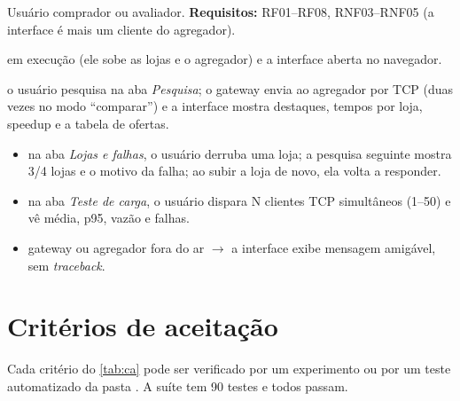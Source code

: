 \begin{description}[leftmargin=0pt, labelsep=0.4em, itemsep=0.15em]
  \item[Ator:] Usuário comprador ou avaliador. \textbf{Requisitos:} RF01--RF08, RNF03--RNF05 (a interface é mais um cliente do agregador).
  \item[Pré-condição:]  em execução (ele sobe as lojas e o agregador) e a interface aberta no navegador.
  \item[Fluxo principal:] o usuário pesquisa na aba \textit{Pesquisa}; o gateway envia  ao agregador por TCP (duas vezes no modo ``comparar'') e a interface mostra destaques, tempos por loja, speedup e a tabela de ofertas.
  \item[Fluxos alternativos:]\leavevmode
  \begin{itemize}
    \item[A1:] na aba \textit{Lojas e falhas}, o usuário derruba uma loja; a pesquisa seguinte mostra 3/4 lojas e o motivo da falha; ao subir a loja de novo, ela volta a responder.
    \item[A2:] na aba \textit{Teste de carga}, o usuário dispara N clientes TCP simultâneos (1--50) e vê média, p95, vazão e falhas.
    \item[A3:] gateway ou agregador fora do ar $\rightarrow$ a interface exibe mensagem amigável, sem \textit{traceback}.
  \end{itemize}
\end{description}

\chapter{Critérios de aceitação}

Cada critério do \autoref{tab:ca} pode ser verificado por um experimento ou por um teste automatizado da pasta . A suíte tem 90 testes e todos passam.

